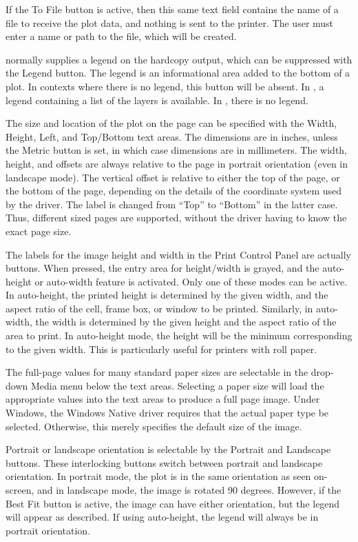 If the {\cb To File} button is active, then this same text field
contains the name of a file to receive the plot data, and nothing is
sent to the printer.  The user must enter a name or path to the file,
which will be created.

{\Xic} normally supplies a legend on the hardcopy output, which can be
suppressed with the {\cb Legend} button.  The legend is an
informational area added to the bottom of a plot.  In contexts where
there is no legend, this button will be absent.  In {\Xic}, a legend
containing a list of the layers is available.  In {\WRspice}, there is
no legend.

The size and location of the plot on the page can be specified with
the {\cb Width}, {\cb Height}, {\cb Left}, and {\cb Top}/{\cb Bottom}
text areas.  The dimensions are in inches, unless the {\cb Metric}
button is set, in which case dimensions are in millimeters.  The
width, height, and offsets are always relative to the page in portrait
orientation (even in landscape mode).  The vertical offset is relative
to either the top of the page, or the bottom of the page, depending on
the details of the coordinate system used by the driver.  The label is
changed from ``{\vt Top}'' to ``{\vt Bottom}'' in the latter case. 
Thus, different sized pages are supported, without the driver having
to know the exact page size. 

The labels for the image height and width in the {\cb Print Control
Panel} are actually buttons.  When pressed, the entry area for
height/width is grayed, and the auto-height or auto-width feature is
activated.  Only one of these modes can be active.  In auto-height,
the printed height is determined by the given width, and the aspect
ratio of the cell, frame box, or window to be printed.  Similarly, in
auto-width, the width is determined by the given height and the aspect
ratio of the area to print.  In auto-height mode, the height will be
the minimum corresponding to the given width.  This is particularly
useful for printers with roll paper.

The full-page values for many standard paper sizes are selectable in
the drop-down {\cb Media} menu below the text areas.  Selecting a
paper size will load the appropriate values into the text areas to
produce a full page image.  Under Windows, the {\et Windows Native}
driver requires that the actual paper type be selected.  Otherwise,
this merely specifies the default size of the image.

Portrait or landscape orientation is selectable by the {\cb Portrait}
and {\cb Landscape} buttons.  These interlocking buttons switch
between portrait and landscape orientation.  In portrait mode, the
plot is in the same orientation as seen on-screen, and in landscape
mode, the image is rotated 90 degrees.  However, if the {\cb Best Fit}
button is active, the image can have either orientation, but the
legend will appear as described.  If using auto-height, the legend
will always be in portrait orientation.

